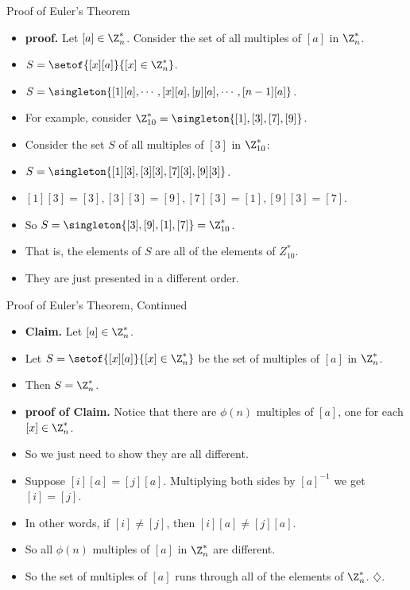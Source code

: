 \documentclass[handout]{beamer}
\begin{document}
\begin{frame}{Proof of Euler's Theorem}

\begin{itemize}
  \item \textbf{proof.} Let $[a] \in \Z_n^*$. Consider the set of all multiples of $[a]$ in $\Z_n^*$.
  \item $S=\setof{[x][a]}{[x]\in\Z^*_n}$.
  \item $S=\singleton{[1][a], \cdots, [x][a],[y][a], \cdots, [n-1][a]}$.
  \item For example, consider $\Z^*_{10} = \singleton{[1],[3],[7],[9]}$.
  \item Consider the set $S$ of all multiples of $[3]$ in $\Z_{10}^*$:
  \item $S = \singleton{[1][3],[3][3],[7][3],[9][3]}$.
  \item $[1][3]=[3], [3][3]=[9], [7][3]=[1], [9][3] = [7]$.
  \item So $S = \singleton{[3],[9],[1],[7]} = \Z^*_{10}$.
  \item That is, the elements of $S$ are all of the elements of $Z^*_{10}$.
  \item They are just presented in a different order.
\end{itemize}

\end{frame}

\begin{frame}{Proof of Euler's Theorem, Continued}

\begin{itemize}
  \item \textbf{Claim.}  Let $[a] \in \Z_n^*$.
  \item Let $S=\setof{[x][a]}{[x]\in\Z^*_n}$ be the set of multiples of $[a]$ in $\Z^*_n$.
  \item Then $S=\Z^*_n$.
  \item \textbf{proof of Claim.} Notice that there are $\phi(n)$ multiples of $[a]$, one for each
  $[x]\in\Z^*_n$.
  \item So we just need to show they are all different.
  \item Suppose $[i][a]=[j][a]$. Multiplying both sides by $[a]^{-1}$ we get $[i]=[j]$.
  \item In other words, if $[i]\not=[j]$, then $[i][a]\not=[j][a]$.
  \item So all $\phi(n)$ multiples of $[a]$ in $\Z_n^*$ are different.
  \item So the set of multiples of $[a]$ runs through all of the elements of $\Z_n^*$. $\diamondsuit$.
\end{itemize}

\end{frame}
\end{document}
